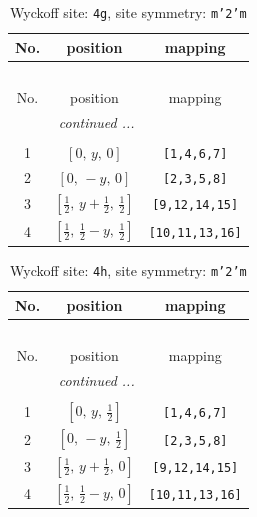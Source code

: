 \documentclass[fleqn,8pt]{jsarticle}
\begin{document}
\renewcommand{\arraystretch}{1.2}
\begin{longtable}{ccc}
\caption{Wyckoff site: {\tt 4g}, site symmetry: {\tt m'2'm}}
 \\
 \hline \hline
No. & position & mapping \\ \hline \endfirsthead

\multicolumn{2}{l}{\tablename\ \thetable{}} \\
 \hline \hline
No. & position & mapping \\ \hline \endhead

 \hline \hline
\multicolumn{2}{r}{\footnotesize\it continued ...} \\ \endfoot

 \hline \hline
\multicolumn{2}{r}{} \\ \endlastfoot

1 & $\left[ 0,\, y,\, 0 \right]$ & {\tt [1,4,6,7]} \\ \hline
2 & $\left[ 0,\, - y,\, 0 \right]$ & {\tt [2,3,5,8]} \\ \hline
3 & $\left[ \frac{1}{2},\, y + \frac{1}{2},\, \frac{1}{2} \right]$ & {\tt [9,12,14,15]} \\ \hline
4 & $\left[ \frac{1}{2},\, \frac{1}{2} - y,\, \frac{1}{2} \right]$ & {\tt [10,11,13,16]} \\
\end{longtable}
\renewcommand{\arraystretch}{1.2}
\begin{longtable}{ccc}
\caption{Wyckoff site: {\tt 4h}, site symmetry: {\tt m'2'm}}
 \\
 \hline \hline
No. & position & mapping \\ \hline \endfirsthead

\multicolumn{2}{l}{\tablename\ \thetable{}} \\
 \hline \hline
No. & position & mapping \\ \hline \endhead

 \hline \hline
\multicolumn{2}{r}{\footnotesize\it continued ...} \\ \endfoot

 \hline \hline
\multicolumn{2}{r}{} \\ \endlastfoot

1 & $\left[ 0,\, y,\, \frac{1}{2} \right]$ & {\tt [1,4,6,7]} \\ \hline
2 & $\left[ 0,\, - y,\, \frac{1}{2} \right]$ & {\tt [2,3,5,8]} \\ \hline
3 & $\left[ \frac{1}{2},\, y + \frac{1}{2},\, 0 \right]$ & {\tt [9,12,14,15]} \\ \hline
4 & $\left[ \frac{1}{2},\, \frac{1}{2} - y,\, 0 \right]$ & {\tt [10,11,13,16]} \\
\end{longtable}
\end{document}
